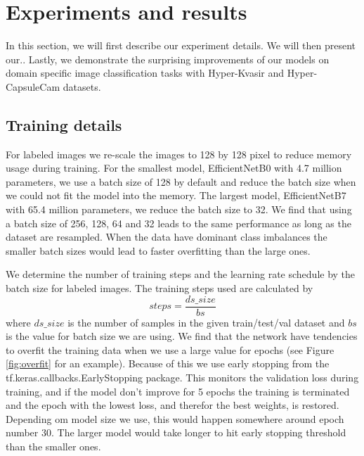 \documentclass[thesis.tex]{subfiles}
\begin{document}
\chapter{Experiments and results} \label{chap:experiments}
In this section, we will first describe our experiment details. We will then present our..
Lastly, we demonstrate the surprising improvements of our models on domain specific image classification tasks with Hyper-Kvasir and Hyper-CapsuleCam datasets.



\section{Training details}

For labeled images we re-scale the images to 128 by 128 pixel to reduce memory usage during training. For the smallest model, EfficientNetB0 with 4.7 million parameters, we use a batch size of 128 by default and reduce the batch size when we could not fit the model into the memory. The largest model, EfficientNetB7 with 65.4 million parameters, we reduce the batch size to 32. We find that using a batch size of 256, 128, 64 and 32 leads to the same performance as long as the dataset are resampled. When the data have dominant class imbalances the smaller batch sizes would lead to faster overfitting than the large ones.

We determine the number of training steps and the learning rate schedule by the batch size for labeled images. The training steps used are calculated by $$ steps = \frac{ds\_size}{bs} $$ where $ds\_size$ is the number of samples in the given train/test/val dataset and $bs$ is the value for batch size we are using. We find that the network have tendencies to overfit the training data when we use a large value for epochs (see Figure \ref{fig:overfit} for an example). Because of this we use early stopping from the tf.keras.callbacks.EarlyStopping package. This  monitors the validation loss during training, and if the model don't improve for 5 epochs the training is terminated and the epoch with the lowest loss, and therefor the best weights, is restored. Depending om model size we use, this would happen somewhere around epoch number 30. The larger model would take longer to hit early stopping threshold than the smaller ones.
\end{document}
